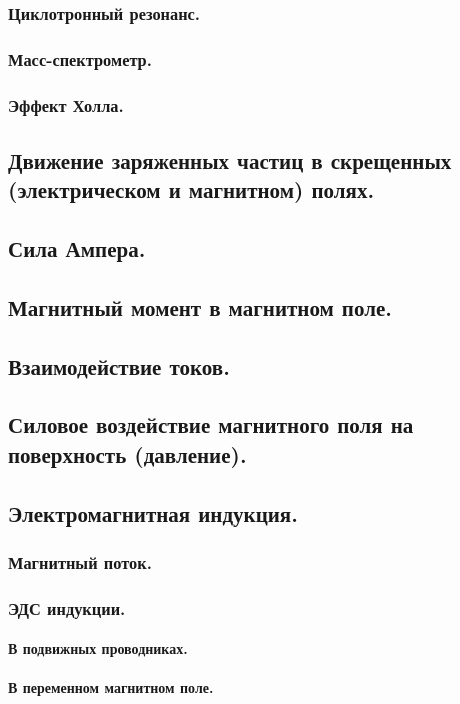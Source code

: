 \documentclass{article}
\begin{document}
        \subsubsection{Циклотронный резонанс.}
        \subsubsection{Масс-спектрометр.}
        \subsubsection{Эффект Холла.}
    \subsection{Движение заряженных частиц в скрещенных (электрическом и магнитном) полях.}
    \subsection{Сила Ампера.}
    \subsection{Магнитный момент в магнитном поле.}
    \subsection{Взаимодействие токов.}
    \subsection{Силовое воздействие магнитного поля на поверхность (давление).}
    \subsection{Электромагнитная индукция.}
        \subsubsection{Магнитный поток.}
        \subsubsection{ЭДС индукции.}
            \paragraph{В подвижных проводниках.}
            \paragraph{В переменном магнитном поле.}
\end{document}
